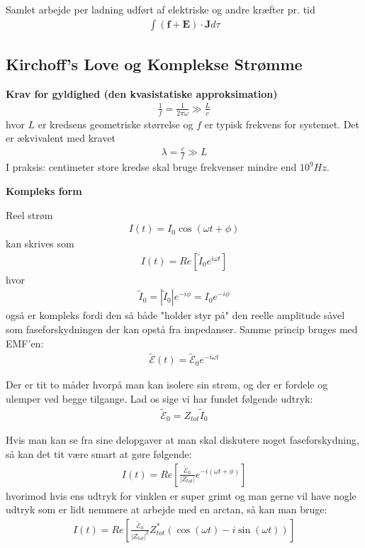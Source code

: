 \documentclass[a4paper]{article}
\begin{document}
    Samlet arbejde per ladning udført af elektriske og andre kræfter pr. tid \begin{align*}
        \int \left( \mathbf{f} + \mathbf{E} \right) \cdot  \mathbf{J} d \tau \tag{K(19)} 
    \end{align*}
    \subsection{Kirchoff's Love og Komplekse Strømme}
    \textbf{Krav for gyldighed (den kvasistatiske approksimation)}
    \begin{align*}
        \frac{1}{f} = \frac{1}{2 \pi  \omega } \gg \frac{L}{c} \tag{K(16)}
    \end{align*}
    hvor \(L\) er kredsens geometriske størrelse og \(f\) er typisk frekvens for systemet. Det er ækvivalent med kravet \begin{align*}
        \lambda = \frac{c}{f} \gg L \tag{K(17)}
    \end{align*}
    I praksis: centimeter store kredse skal bruge frekvenser mindre end \(10^9 Hz\).
    
    \textbf{Kompleks form}

    Reel strøm \begin{align*}
        I(t) = I_0 \cos (\omega t + \phi )
    \end{align*} 
    kan skrives som \begin{align*}
        I(t) =  Re\left[ \tilde{I}_0 e^{i \omega t} \right]
    \end{align*}
    hvor \begin{align*}
        \tilde{I}_0 = |\tilde{I}_0| e^{-i \phi } = I_0 e^{-i \phi }
    \end{align*}
    også er kompleks fordi den så både "holder styr på" den reelle amplitude såvel som faseforskydningen der kan opstå fra impedanser. Samme princip bruges med EMF'en:
    \begin{align*}
        \tilde{\mathcal{E} }(t) = \tilde{\mathcal{E}}_0 e^{-i \omega t}
    \end{align*}

    Der er tit to måder hvorpå man kan isolere sin strøm, og der er fordele og ulemper ved begge tilgange. Lad os sige vi har fundet følgende udtryk:
    \begin{align*}
        \tilde{\mathcal{E}}_0 = Z_{tot} \tilde{I}_0
    \end{align*}
    
    Hvis man kan se fra sine delopgaver at man skal diskutere noget faseforskydning, så kan det tit være smart at gøre følgende: \begin{align*}
        I(t) = Re \left[\frac{\tilde{\mathcal{E}}_0}{\left| Z_{tot} \right| } e^{-i{(\omega t + \phi )}}\right]
    \end{align*}
    hvorimod hvis ens udtryk for vinklen er super grimt og man gerne vil have nogle udtryk som er lidt nemmere at arbejde med en arctan, så kan man bruge: \begin{align*}
        I(t) = Re \left[\frac{\tilde{\mathcal{E}}_0}{ \left| Z_{tot}  \right|^{2}   } Z_{tot} ^{\ast} \left( \cos (\omega t) - i \sin (\omega t) \right)\right] 
    \end{align*}
\end{document}
